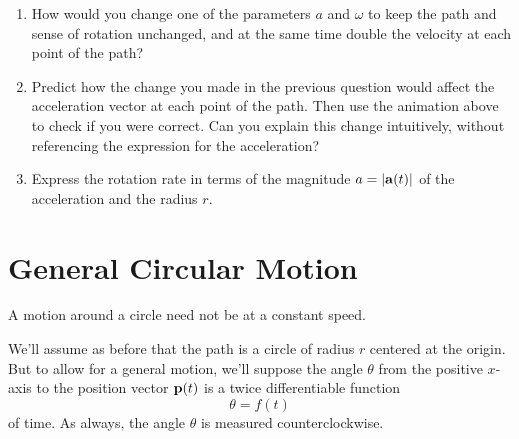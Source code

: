 \documentclass{ximera}
\begin{document}
\begin{question}
\begin{enumerate}
\item How would you change one of the parameters $a$ and $\omega$ to keep the path and sense of rotation unchanged, and at the same time double the velocity at each point of the path?

\item Predict how the change you made in the previous question would affect the acceleration vector at each point of the path. Then use the animation above to check if you were correct. Can you explain this change intuitively, without referencing the expression for the acceleration?

\item Express the rotation rate in terms of the magnitude $a = | {\bf a}(t)|$ of the acceleration and the radius $r$.

\end{enumerate}
\end{question}

\section{General Circular Motion}
A motion around a circle need not be at a constant speed. 

We'll assume as before that the path is a circle of radius $r$ centered at the origin. But to allow for a general motion, we'll suppose the angle $\theta$ from the positive $x$-axis to the position vector ${\bf p}(t)$ is a twice differentiable function
\[
   \theta = f(t)
\]
of time. As always, the angle $\theta$ is measured counterclockwise. 
\end{document}
